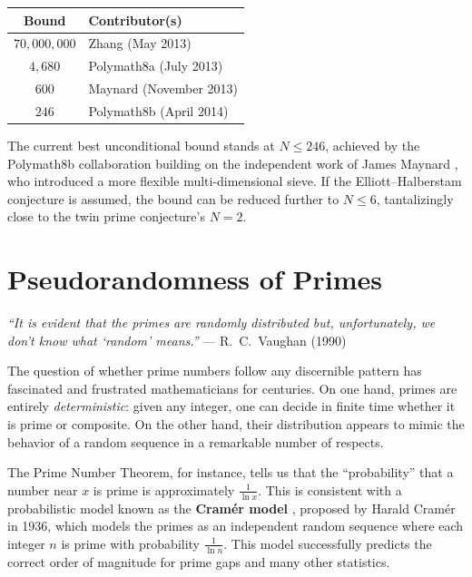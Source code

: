 \documentclass[11pt]{article}
\theoremstyle{plain}
\theoremstyle{definition}
\theoremstyle{remark}
\begin{document}
\begin{center}
\begin{tabular}{cl}
\toprule
\textbf{Bound} & \textbf{Contributor(s)} \\
\midrule
$70{,}000{,}000$ & Zhang (May 2013) \\
$4{,}680$ & Polymath8a (July 2013) \\
$600$ & Maynard (November 2013) \\
$246$ & Polymath8b (April 2014) \\
\bottomrule
\end{tabular}
\end{center}

\par The current best unconditional bound stands at $N \leq 246$, achieved by the Polymath8b collaboration \cite{polymath8b_2014} building on the independent work of James Maynard \cite{maynard_primes_2015}, who introduced a more flexible multi-dimensional sieve. If the Elliott--Halberstam conjecture is assumed, the bound can be reduced further to $N \leq 6$, tantalizingly close to the twin prime conjecture's $N = 2$.

\section{Pseudorandomness of Primes}

\par \textit{``It is evident that the primes are randomly distributed but, unfortunately, we don't know what `random' means.''} \hfill --- R.~C.~Vaughan (1990)

\bigskip

\par The question of whether prime numbers follow any discernible pattern has fascinated and frustrated mathematicians for centuries. On one hand, primes are entirely \textit{deterministic}: given any integer, one can decide in finite time whether it is prime or composite. On the other hand, their distribution appears to mimic the behavior of a random sequence in a remarkable number of respects.

\par The Prime Number Theorem, for instance, tells us that the ``probability'' that a number near $x$ is prime is approximately $\frac{1}{\ln x}$. This is consistent with a probabilistic model known as the \textbf{Cram\'{e}r model} \cite{cramer_model_1936}, proposed by Harald Cram\'{e}r in 1936, which models the primes as an independent random sequence where each integer $n$ is prime with probability $\frac{1}{\ln n}$. This model successfully predicts the correct order of magnitude for prime gaps and many other statistics.
\end{document}
